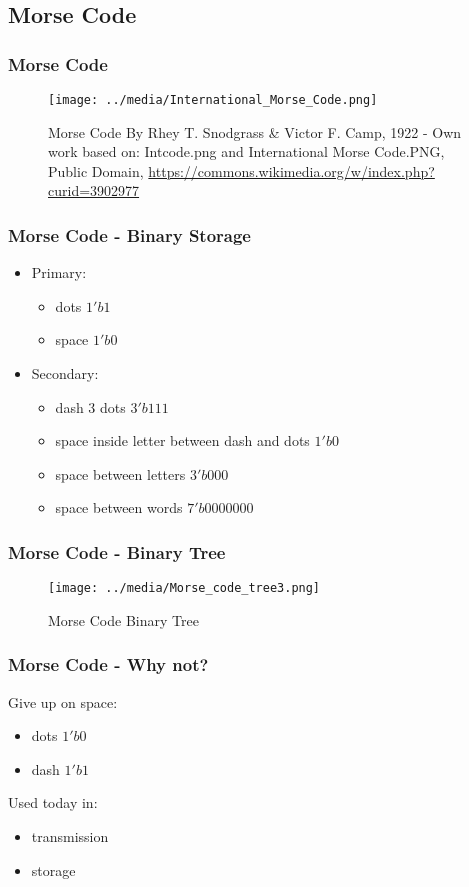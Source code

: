 \subsection{Morse Code}

\begin{frame}
    \frametitle{Morse Code}
        \begin{figure}
            \caption{Morse Code By Rhey T. Snodgrass \& Victor F. Camp, 1922 - Own work based on: Intcode.png and International Morse Code.PNG, Public Domain, \url{https://commons.wikimedia.org/w/index.php?curid=3902977}}
            \texttt{[image: ../media/International\_Morse\_Code.png]}
        \end{figure}
    \note{
    }
\end{frame}

\begin{frame}
    \frametitle{Morse Code - Binary Storage}
    \begin{itemize}
        \item Primary:
        \begin{itemize}
            \item dots $1'b1$
            \item space $1'b0$
        \end{itemize}
        \item Secondary:
        \begin{itemize}
            \item dash 3 dots $3'b111$
            \item space inside letter between dash and dots $1'b0$
            \item space between letters $3'b000$
            \item space between words $7'b0000000$
        \end{itemize}
    \end{itemize}
    \note{
    }
\end{frame}

\begin{frame}
    \frametitle{Morse Code - Binary Tree}
    \begin{figure}
        \caption{Morse Code Binary Tree}
        \texttt{[image: ../media/Morse\_code\_tree3.png]}
    \end{figure}
    \note{
    }
\end{frame}

\begin{frame}
    \frametitle{Morse Code - Why not?}
    Give up on space:
    \begin{itemize}
        \item dots $1'b0$
        \item dash $1'b1$
    \end{itemize}
    Used today in:
    \begin{itemize}
        \item transmission
        \item storage
    \end{itemize}
\end{frame}

